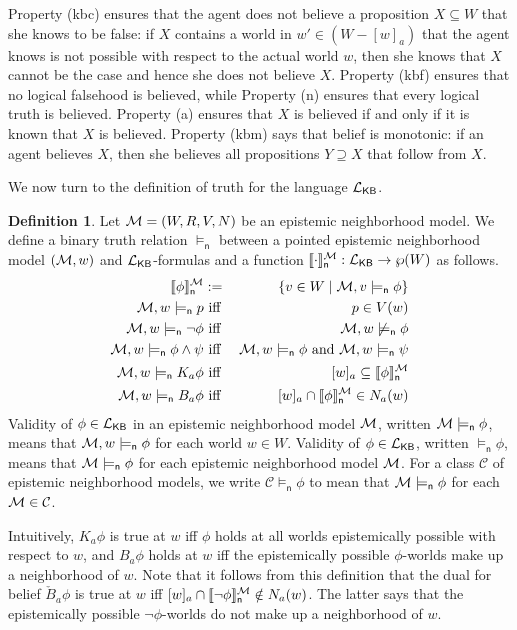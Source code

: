 \documentclass[12pt]{article}
\theoremstyle{definition}
\newtheorem{definition}[theorem]{Definition}
\newcommand{\M}{{\cal M}}      %
\newcommand{\Lang}{{\cal L}}   %
\newcommand{\KB}{{\mathsf{KB}}}                        %
\newcommand{\modelsn}{\models_{\mathsf{n}}}                  %
\newcommand{\semn}[1]{\llbracket{#1}\rrbracket_{\mathsf{n}}} %
\begin{document}
Property (kbc) ensures that the agent does not believe a proposition
$X\subseteq W$ that she knows to be false: if $X$ contains a world in
$w'\in(W-[w]_a)$ that the agent knows is not possible with respect to
the actual world $w$, then she knows that $X$ cannot be the case and
hence she does not believe $X$.  Property (kbf) ensures that no
logical falsehood is believed, while Property (n) ensures that every
logical truth is believed.  Property (a) ensures that $X$ is believed
if and only if it is known that $X$ is believed. Property (kbm) says
that belief is monotonic: if an agent believes $X$, then she believes
all propositions $Y\supseteq X$ that follow from $X$.

We now turn to the definition of truth for the language $\Lang_\KB$.

\begin{definition} 
  Let $\M = (W,R,V,N)$ be an epistemic neighborhood model.  We define
  a binary truth relation $\modelsn$ between a pointed epistemic
  neighborhood model $(\M,w)$ and $\Lang_\KB$-formulas and a function
  $\semn{\cdot}^\M:\Lang_\KB\to \wp(W)$ as follows.
  \begin{eqnarray*} 
    \semn{\phi}^\M & := & \{v\in W\mid \M,v\modelsn\phi\}
    \\
    \M, w \modelsn p & \text{ iff } & p \in V(w) 
    \\
    \M, w \modelsn \neg \phi & \text{ iff } & \M, w \not\modelsn \phi 
    \\
    \M, w \modelsn \phi\land\psi  & \text{ iff } 
    & \M, w \modelsn \phi \text{ and } \M, w \modelsn \psi
    \\
    \M, w \modelsn K_a \phi  & \text{ iff } & 
    [w]_a\subseteq\semn{\phi}^\M
    \\
    \M, w \modelsn B_a \phi  & \text{ iff } &
    [w]_a\cap \semn{\phi}^\M \in N_a(w)
  \end{eqnarray*}
  Validity of $\phi\in\Lang_\KB$ in an epistemic neighborhood model
  $\M$, written $\M\modelsn\phi$, means that $\M,w\modelsn\phi$ for
  each world $w\in W$.  Validity of $\phi\in\Lang_\KB$, written
  $\modelsn\phi$, means that $\M\modelsn\phi$ for each epistemic
  neighborhood model $\M$.  For a class $\mathcal{C}$ of epistemic
  neighborhood models, we write $\mathcal{C}\modelsn\phi$ to mean that
  $\M\modelsn\phi$ for each $\M\in\mathcal{C}$.
\end{definition}

Intuitively, $K_a\phi$ is true at $w$ iff $\phi$ holds at all worlds
epistemically possible with respect to $w$, and $B_a\phi$ holds at $w$
iff the epistemically possible $\phi$-worlds make up a neighborhood of
$w$.  Note that it follows from this definition that the dual for
belief $\check{B}_a \phi$ is true at $w$ iff
$[w]_a\cap\semn{\neg\phi}^\M\notin N_a(w)$.  The latter says that the
epistemically possible $\lnot\phi$-worlds do not make up a
neighborhood of $w$.
\end{document}
